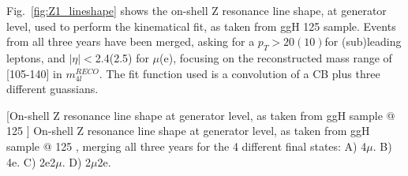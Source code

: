 Fig.~\ref{fig:Z1_lineshape} shows the on-shell Z resonance line shape, at generator level, 
used to perform the kinematical fit, as taken from ggH 125 \GeV sample. 
Events from all three years have been merged, asking for a 
$p_T > 20(10)$\GeV for (sub)leading leptons, and $|\eta|<$2.4(2.5) for $\mu$(e), focusing on
the reconstructed mass range of [105-140] \GeV in $m_{4l}^{RECO}$. The fit function used is a convolution
of a CB plus three different guassians.
\begin{multiFigure}[!htbp]
    \centering
        [On-shell Z resonance line shape at generator level, as taken from ggH sample @ 125 \GeV]
        {On-shell Z resonance line shape at generator level, as taken from ggH sample @ 125 \GeV, %
        merging all three years for the 4 different final states:
        \;A) 4$\mu$.
        \;B) 4e.
        \;C) 2e2$\mu$.
        \;D) 2$\mu$2e.
        }
    \label{fig:Z1_lineshape}
\end{multiFigure}
